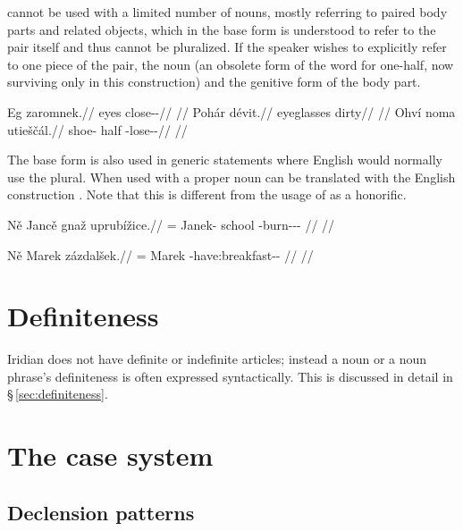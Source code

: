  cannot be used with a limited number of nouns, mostly referring to paired body parts and related objects, which in the base form is understood to refer to the pair itself and thus cannot be pluralized. If the speaker wishes to explicitly refer to one piece of the pair, the noun  (an obsolete form of the word for one-half, now surviving only in this construction) and the genitive form of the body part.

\pex
\begingl
\gla Eg zaromnek.//
\glb eyes close-\Pv{}-\Pf{}//
\glft {}//
\endgl
\xe
\pex
\begingl
\gla Pohár dévit.//
\glb eyeglasses dirty//
\glft {}//
\endgl
\xe
\pex
\begingl
\gla Ohví noma utieščál.//
\glb shoe-\Gen{} half \Refl{}-lose-\Av{}-\Cont{}//
\glft {}//
\endgl
\xe

The base form is also used in generic statements where English would normally
use the plural. When used with a
proper noun  can be translated with the English construction . Note that this is different from the usage of  as a honorific.

\pex
\begingl
    \gla Ně Jancě gnaž uprubížice.//
    \glb \Pl{}= Janek-\Gen{} school \Refl{}-burn-\Av{}-\Pf{}-\Quot{} //
    \glft {}//
\endgl
\xe

\pex
\begingl
    \gla Ně Marek zázdalšek.//
    \glb \Pl{}= Marek \Neg{}-have:breakfast-\Av{}-\Pf{} //
    \glft {}//
\endgl
\xe


\section{Definiteness}
Iridian does not have definite or indefinite articles; instead a noun or a noun phrase's definiteness is often expressed syntactically. This is discussed in detail in \S\,\ref{sec:definiteness}.

\section{The case system}

\subsection{Declension patterns}

